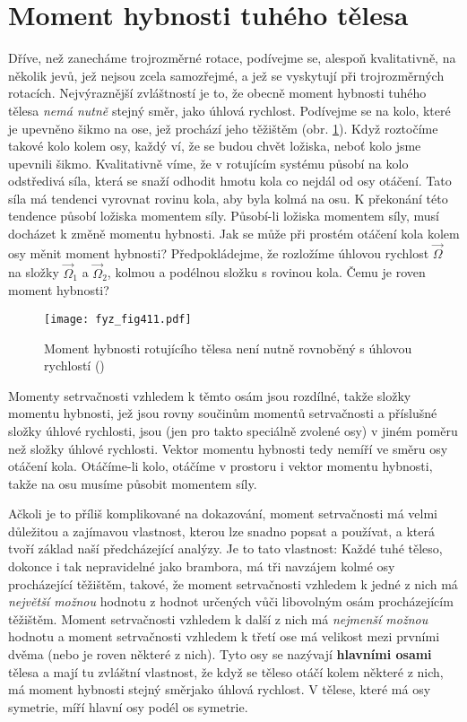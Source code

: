   \section{Moment hybnosti tuhého tělesa}\label{fyz:IchapXXsecIV}
    Dříve, než zanecháme trojrozměrné rotace, podívejme se, alespoň kvalitativně, na několik jevů,
    jež nejsou zcela samozřejmé, a jež se vyskytují při trojrozměrných rotacích. Nejvýraznější
    zvláštností je to, že obecně moment hybnosti tuhého tělesa \emph{nemá nutně} stejný směr, jako
    úhlová rychlost. Podívejme se na kolo, které je upevněno šikmo na ose, jež prochází jeho
    těžištěm (obr. \ref{fyz:fig411}). Když roztočíme takové kolo kolem osy, každý ví, že se budou
    chvět ložiska, neboť kolo jsme upevnili šikmo. Kvalitativně víme, že v rotujícím systému působí
    na kolo odstředivá síla, která se snaží odhodit hmotu kola co nejdál od osy otáčení. Tato síla
    má tendenci vyrovnat rovinu kola, aby byla kolmá na osu. K překonání této tendence působí
    ložiska momentem síly. Působí-li ložiska momentem síly, musí docházet k změně momentu hybnosti.
    Jak se může při prostém otáčení kola kolem osy měnit moment hybnosti? Předpokládejme, že
    rozložíme úhlovou rychlost \(\vec{\Omega}\) na složky \(\vec{\Omega}_1\) a \(\vec{\Omega}_2\),
    kolmou a podélnou složku s rovinou kola. Čemu je roven moment hybnosti?

    \begin{figure}[ht!] %
      \centering
      \texttt{[image: fyz\_fig411.pdf]}
      \caption{Moment hybnosti rotujícího tělesa není nutně rovnoběný s úhlovou rychlostí
              (\cite[s.~282]{Feynman01})}
      \label{fyz:fig411}
    \end{figure}

    Momenty setrvačnosti vzhledem k těmto osám jsou rozdílné, takže složky momentu hybnosti, jež
    jsou rovny součinům momentů setrvačnosti a příslušné složky úhlové rychlosti, jsou (jen pro
    takto speciálně zvolené osy) v jiném poměru než složky úhlové rychlosti. Vektor momentu hybnosti
    tedy nemíří ve směru osy otáčení kola. Otáčíme-li kolo, otáčíme v prostoru i vektor momentu
    hybnosti, takže na osu musíme působit momentem síly.

    Ačkoli je to příliš komplikované na dokazování, moment setrvačnosti má velmi důležitou a
    zajímavou vlastnost, kterou lze snadno popsat a používat, a která tvoří základ naší
    předcházející analýzy. Je to tato vlastnost: Každé tuhé těleso, dokonce i tak nepravidelné jako
    brambora, má tři navzájem kolmé osy procházející těžištěm, takové, že moment setrvačnosti
    vzhledem k jedné z nich má \emph{největší možnou} hodnotu z hodnot určených vůči libovolným osám
    procházejícím těžištěm. Moment setrvačnosti vzhledem k další z nich má \emph{nejmenší možnou}
    hodnotu a moment setrvačnosti vzhledem k třetí ose má velikost mezi prvními dvěma (nebo je roven
    některé z nich). Tyto osy se nazývají \textbf{hlavními osami} tělesa a mají tu zvláštní
    vlastnost, že když se těleso otáčí kolem některé z nich, má moment hybnosti stejný směrjako
    úhlová rychlost. V tělese, které má osy symetrie, míří hlavní osy podél os symetrie.

